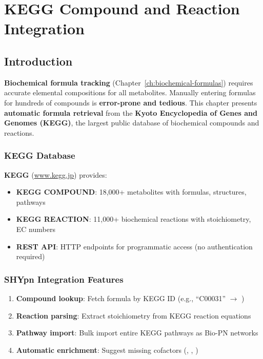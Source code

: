 \chapter{KEGG Compound and Reaction Integration}
\label{ch:kegg}

\section{Introduction}
\label{sec:kegg-intro}

\textbf{Biochemical formula tracking} (Chapter~\ref{ch:biochemical-formulas}) requires accurate elemental compositions for all metabolites. Manually entering formulas for hundreds of compounds is \textbf{error-prone and tedious}. This chapter presents \textbf{automatic formula retrieval} from the \textbf{Kyoto Encyclopedia of Genes and Genomes (KEGG)}, the largest public database of biochemical compounds and reactions.

\subsection{KEGG Database}
\label{subsec:kegg-database}

\textbf{KEGG} (\url{www.kegg.jp}) provides:

\begin{itemize}
    \item \textbf{KEGG COMPOUND}: 18,000+ metabolites with formulas, structures, pathways
    \item \textbf{KEGG REACTION}: 11,000+ biochemical reactions with stoichiometry, EC numbers
    \item \textbf{REST API}: HTTP endpoints for programmatic access (no authentication required)
\end{itemize}

\subsection{SHYpn Integration Features}
\label{subsec:shypn-kegg-integration}

\begin{enumerate}
    \item \textbf{Compound lookup}: Fetch formula by KEGG ID (e.g., ``C00031'' $\to$ )
    \item \textbf{Reaction parsing}: Extract stoichiometry from KEGG reaction equations
    \item \textbf{Pathway import}: Bulk import entire KEGG pathways as Bio-PN networks
    \item \textbf{Automatic enrichment}: Suggest missing cofactors (, , )
\end{enumerate}

